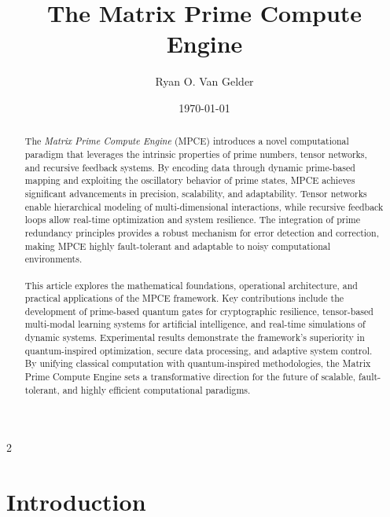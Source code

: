 \documentclass{article}
\theoremstyle{plain}
\begin{document}
\title{The Matrix Prime Compute Engine}

\author{Ryan O. Van Gelder}
\date{\today}

\maketitle

\begin{abstract}
The \textit{Matrix Prime Compute Engine} (MPCE) introduces a novel computational paradigm that leverages the intrinsic properties of prime numbers, tensor networks, and recursive feedback systems. By encoding data through dynamic prime-based mapping and exploiting the oscillatory behavior of prime states, MPCE achieves significant advancements in precision, scalability, and adaptability. Tensor networks enable hierarchical modeling of multi-dimensional interactions, while recursive feedback loops allow real-time optimization and system resilience. The integration of prime redundancy principles provides a robust mechanism for error detection and correction, making MPCE highly fault-tolerant and adaptable to noisy computational environments.
\paragraph{} This article explores the mathematical foundations, operational architecture, and practical applications of the MPCE framework. Key contributions include the development of prime-based quantum gates for cryptographic resilience, tensor-based multi-modal learning systems for artificial intelligence, and real-time simulations of dynamic systems. Experimental results demonstrate the framework's superiority in quantum-inspired optimization, secure data processing, and adaptive system control. By unifying classical computation with quantum-inspired methodologies, the Matrix Prime Compute Engine sets a transformative direction for the future of scalable, fault-tolerant, and highly efficient computational paradigms.
\end{abstract}

\newpage
\begin{multicols}{2}
\begin{singlespace}
\tableofcontents
\end{singlespace}
\end{multicols}
\section{Introduction}
\end{document}
